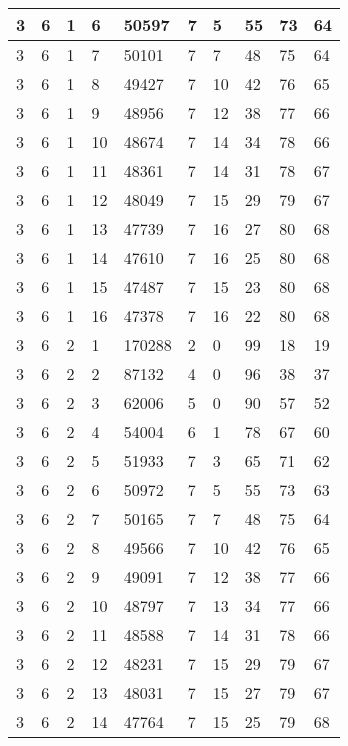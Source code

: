 \begin{table}[!ht]
\begin{tabular}{|l|l|l|l|l|l|l|l|l|l|}
        3 & 6 & 1 & 6 & 50597 & 7 & 5 & 55 & 73 & 64 \\ \hline
        3 & 6 & 1 & 7 & 50101 & 7 & 7 & 48 & 75 & 64 \\ \hline
        3 & 6 & 1 & 8 & 49427 & 7 & 10 & 42 & 76 & 65 \\ \hline
        3 & 6 & 1 & 9 & 48956 & 7 & 12 & 38 & 77 & 66 \\ \hline
        3 & 6 & 1 & 10 & 48674 & 7 & 14 & 34 & 78 & 66 \\ \hline
        3 & 6 & 1 & 11 & 48361 & 7 & 14 & 31 & 78 & 67 \\ \hline
        3 & 6 & 1 & 12 & 48049 & 7 & 15 & 29 & 79 & 67 \\ \hline
        3 & 6 & 1 & 13 & 47739 & 7 & 16 & 27 & 80 & 68 \\ \hline
        3 & 6 & 1 & 14 & 47610 & 7 & 16 & 25 & 80 & 68 \\ \hline
        3 & 6 & 1 & 15 & 47487 & 7 & 15 & 23 & 80 & 68 \\ \hline
        3 & 6 & 1 & 16 & 47378 & 7 & 16 & 22 & 80 & 68 \\ \hline
        3 & 6 & 2 & 1 & 170288 & 2 & 0 & 99 & 18 & 19 \\ \hline
        3 & 6 & 2 & 2 & 87132 & 4 & 0 & 96 & 38 & 37 \\ \hline
        3 & 6 & 2 & 3 & 62006 & 5 & 0 & 90 & 57 & 52 \\ \hline
        3 & 6 & 2 & 4 & 54004 & 6 & 1 & 78 & 67 & 60 \\ \hline
        3 & 6 & 2 & 5 & 51933 & 7 & 3 & 65 & 71 & 62 \\ \hline
        3 & 6 & 2 & 6 & 50972 & 7 & 5 & 55 & 73 & 63 \\ \hline
        3 & 6 & 2 & 7 & 50165 & 7 & 7 & 48 & 75 & 64 \\ \hline
        3 & 6 & 2 & 8 & 49566 & 7 & 10 & 42 & 76 & 65 \\ \hline
        3 & 6 & 2 & 9 & 49091 & 7 & 12 & 38 & 77 & 66 \\ \hline
        3 & 6 & 2 & 10 & 48797 & 7 & 13 & 34 & 77 & 66 \\ \hline
        3 & 6 & 2 & 11 & 48588 & 7 & 14 & 31 & 78 & 66 \\ \hline
        3 & 6 & 2 & 12 & 48231 & 7 & 15 & 29 & 79 & 67 \\ \hline
        3 & 6 & 2 & 13 & 48031 & 7 & 15 & 27 & 79 & 67 \\ \hline
        3 & 6 & 2 & 14 & 47764 & 7 & 15 & 25 & 79 & 68 \\ \hline

\end{tabular}
\end{table}
